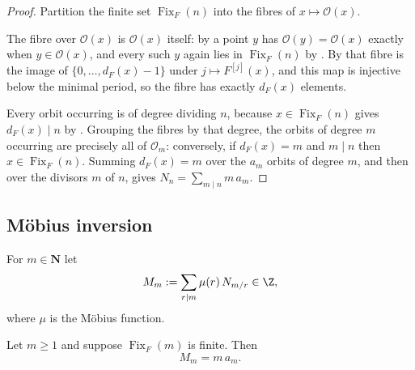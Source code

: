 \begin{proof}
  \leanok
  Partition the finite set $\operatorname{Fix}_F(n)$ into the fibres of
  $x\mapsto\mathcal O(x)$.

  The fibre over $\mathcal O(x)$ is $\mathcal O(x)$ itself: by
   a point $y$ has
  $\mathcal O(y)=\mathcal O(x)$ exactly when $y\in\mathcal O(x)$, and every
  such $y$ again lies in $\operatorname{Fix}_F(n)$ by
  .  By
   that fibre is the image of
  $\{0,\dots,d_F(x)-1\}$ under $j\mapsto F^{[j]}(x)$, and this map is
  injective below the minimal period, so the fibre has exactly $d_F(x)$
  elements.

  Every orbit occurring is of degree dividing $n$, because
  $x\in\operatorname{Fix}_F(n)$ gives $d_F(x)\mid n$ by
  .  Grouping the
  fibres by that degree, the orbits of degree $m$ occurring are precisely all
  of $\mathcal O_m$: conversely, if $d_F(x)=m$ and $m\mid n$ then
  $x\in\operatorname{Fix}_F(n)$.  Summing $d_F(x)=m$ over the $a_m$ orbits of
  degree $m$, and then over the divisors $m$ of $n$, gives
  $N_n=\sum_{m\mid n}m\,a_m$.
\end{proof}

\subsection{Möbius inversion}

\begin{definition}
  \label{def:weil-orbit-count-mobius-numerator}
  \leanok

  For $m\in\mathbf N$ let
  \[
    M_m:=\sum_{r\mid m}\mu(r)\,N_{m/r}\in\Z ,
  \]
  where $\mu$ is the Möbius function.
\end{definition}

\begin{lemma}
  \label{lemma:weil-orbit-count-mobius-numerator-eq}
  \leanok

  Let $m\ge 1$ and suppose $\operatorname{Fix}_F(m)$ is finite.  Then
  \[
    M_m=m\,a_m .
  \]
\end{lemma}

